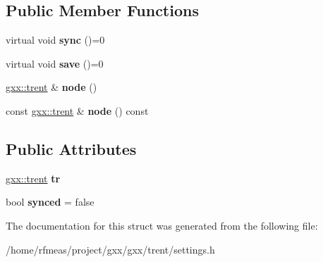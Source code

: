 \subsection*{Public Member Functions}
\begin{DoxyCompactItemize}
\item 
virtual void {\bfseries sync} ()=0\hypertarget{structgxx_1_1trent__settings_a45b9e7e988b51c81b14d52b298a866f0}{}\label{structgxx_1_1trent__settings_a45b9e7e988b51c81b14d52b298a866f0}

\item 
virtual void {\bfseries save} ()=0\hypertarget{structgxx_1_1trent__settings_a5ccf0a501f6e2dad21f893a63c4a4cdd}{}\label{structgxx_1_1trent__settings_a5ccf0a501f6e2dad21f893a63c4a4cdd}

\item 
\hyperlink{classgxx_1_1trent}{gxx\+::trent} \& {\bfseries node} ()\hypertarget{structgxx_1_1trent__settings_a43fb1071f1cc9f4f7db2cf6d7399ccd8}{}\label{structgxx_1_1trent__settings_a43fb1071f1cc9f4f7db2cf6d7399ccd8}

\item 
const \hyperlink{classgxx_1_1trent}{gxx\+::trent} \& {\bfseries node} () const \hypertarget{structgxx_1_1trent__settings_aeff500d7e878ba7a25f879cb0c44f7ee}{}\label{structgxx_1_1trent__settings_aeff500d7e878ba7a25f879cb0c44f7ee}

\end{DoxyCompactItemize}
\subsection*{Public Attributes}
\begin{DoxyCompactItemize}
\item 
\hyperlink{classgxx_1_1trent}{gxx\+::trent} {\bfseries tr}\hypertarget{structgxx_1_1trent__settings_ae4bf3faafd7ebe8a97f36f6e2be1972e}{}\label{structgxx_1_1trent__settings_ae4bf3faafd7ebe8a97f36f6e2be1972e}

\item 
bool {\bfseries synced} = false\hypertarget{structgxx_1_1trent__settings_a51a15b46d3b547d1cd9b6394d3957afd}{}\label{structgxx_1_1trent__settings_a51a15b46d3b547d1cd9b6394d3957afd}

\end{DoxyCompactItemize}


The documentation for this struct was generated from the following file\+:\begin{DoxyCompactItemize}
\item 
/home/rfmeas/project/gxx/gxx/trent/settings.\+h\end{DoxyCompactItemize}
